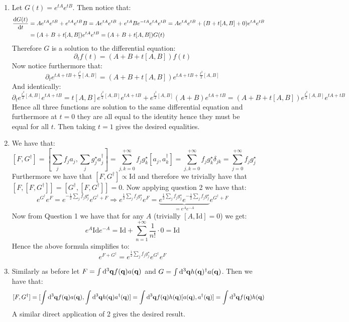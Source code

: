 \documentclass[10pt,a4paper]{article}
\begin{document}
\begin{enumerate}
\item Let $G(t) = e^{tA} e^{tB}$.  Then notice that:
\begin{align*}
\dv{G(t)}{t} &= A e^{tA} e^{t B} + e^{tA} e^{tB} B = A e^{tA} e^{tB} + e^{tA} B e^{-tA} e^{tA} e^{tB} = A e^{tA} e^{t B} + (B + t[A, B] + 0) e^{tA} e^{tB}\\
&= (A + B + t[A, B]) e^{tA} e^{tB} = (A + B + t[A, B]) G(t) 
\end{align*}
Therefore $G$ is a solution to the differential equation:
\[
\partial_t f(t) = (A + B + t[A, B]) f(t)
\]
Now notice furthermore that:
\[
\partial_t e^{tA + tB + \frac{t^2}{2} [A, B]} = (A + B + t[A, B])e^{tA + tB + \frac{t^2}{2}[A, B]}
\]
And identically:
\[
\partial_t e^{\frac{t^2}{2}[A, B]} e^{tA + tB} = t[A, B] e^{\frac{t^2}{2}[A, B]} e^{t A + tB} + e^{\frac{t^2}{2}[A, B]} (A + B) e^{tA + tB} = (A + B + t[A, B])e^{\frac{t^2}{2}[A, B]} e^{tA + tB} 
\]
Hence all three functions are solution to the same differential equation and furthermore at $t = 0$ they are all equal to the identity hence they must be equal for all $t$. Then taking $t = 1$ gives the desired equalities.


\item We have that:
\[
[F, G^\dagger] = [\sum_j f_j a_j, \sum_j g_j^\star a_j^\dagger] = \sum_{j, k = 0}^{+\infty} f_j g_k^\star [a_j, a_k^\dagger] = \sum_{j, k = 0}^{+\infty} f_j g_k^\star \delta_{jk} = \sum_{j = 0}^{+\infty} f_j g_j^\star
\]
Furthermore we have that $[F, G^\dagger] \propto \text{Id}$ and therefore we trivially have that $[F, [F, G^\dagger]] = [G^\dagger, [F, G^\dagger]] = 0$. Now applying question 2 we have that:
\[
e^{G^\dagger} e^F = e^{-\frac{1}{2} \sum_{j} f_j g_j^\star } e^{G^\dagger + F} \Rightarrow  e^{\frac{1}{2} \sum_{j} f_j g_j^\star }e^F =  \underbrace{e^{\frac{1}{2} \sum_{j} f_j g_j^\star } e^{-\frac{1}{2} \sum_{j} f_j g_j^\star }}_{=e^A e^{-A}} e^{G^\dagger + F}
\]
Now from Question 1 we have that for any $A$ (trivially $[A, \text{Id}] = 0$) we get:
\[
e^A \text{Id} e^{-A} = \text{Id} + \sum_{n=1}^{+\infty} \frac{1}{n!} \cdot 0 = \text{Id}
\]
Hence the above formula simplifies to:
\[
e^{F + G^\dagger} = e^{\frac{1}{2}\sum_j f_jg_j^\star} e^{G^\dagger} e^F
\]

\item Similarly as before let $F = \int \dd^3 \vb{q} f(\vb{q}) a(\vb{q})$ and $G = \int \dd^3 \vb{q} h(\vb{q})^\dagger a(\vb{q})$. Then we have that:
\[
[F, G^\dagger] = [ \int \dd^3 \vb{q} f(\vb{q}) a(\vb{q}), \int \dd^3 \vb{q} h(\vb{q}) a^\dagger(\vb{q})] = \int \dd^3 \vb{q} f(\vb{q})h(\vb{q})[a(\vb{q}), a^\dagger(\vb{q})] = \int \dd^3 \vb{q} f(\vb{q}) h(\vb{q})
\]
A similar direct application of 2 gives the desired result.

\end{enumerate}
\end{document}
